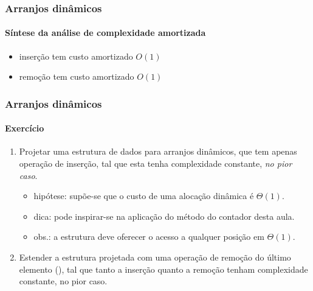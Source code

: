 \documentclass{beamer}
\begin{document}
\begin{frame}
\frametitle{Arranjos dinâmicos}
\framesubtitle{Síntese da análise de complexidade amortizada}
\begin{itemize}
  \item inserção tem custo amortizado $O(1)$
  \item remoção tem custo amortizado $O(1)$
\end{itemize}
\end{frame}

\begin{frame}
\frametitle{Arranjos dinâmicos}
\framesubtitle{Exercício}

\begin{enumerate}
\item Projetar uma estrutura de dados para arranjos dinâmicos, que tem apenas
  operação de inserção, tal que esta tenha complexidade constante, \emph{no pior
    caso}.
  \begin{itemize}
  \item hipótese: supõe-se que o custo de uma alocação dinâmica é $\Theta(1)$.
  \item dica: pode inspirar-se na aplicação do método do contador desta aula.
  \item obs.: a estrutura deve oferecer o acesso a qualquer posição em
    $\Theta(1)$.
  \end{itemize}
\item Estender a estrutura projetada com uma operação de remoção do último
  elemento (), tal que tanto a inserção quanto a remoção
  tenham complexidade constante, no pior caso.
\end{enumerate}

\end{frame}
\end{document}
